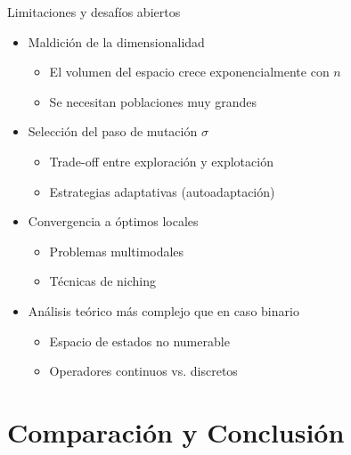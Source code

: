\documentclass[10pt, aspectratio=169]{beamer}
\begin{document}
\begin{frame}{Limitaciones y desafíos abiertos}
\begin{itemize}
    \item \alert{Maldición de la dimensionalidad}
    \begin{itemize}
        \item El volumen del espacio crece exponencialmente con $n$
        \item Se necesitan poblaciones muy grandes
    \end{itemize}
    \item \alert{Selección del paso de mutación $\sigma$}
    \begin{itemize}
        \item Trade-off entre exploración y explotación
        \item Estrategias adaptativas (autoadaptación)
    \end{itemize}
    \item \alert{Convergencia a óptimos locales}
    \begin{itemize}
        \item Problemas multimodales
        \item Técnicas de niching
    \end{itemize}
    \item \alert{Análisis teórico} más complejo que en caso binario
    \begin{itemize}
        \item Espacio de estados no numerable
        \item Operadores continuos vs. discretos
    \end{itemize}
\end{itemize}
\end{frame}

\section{Comparación y Conclusión}
\end{document}
